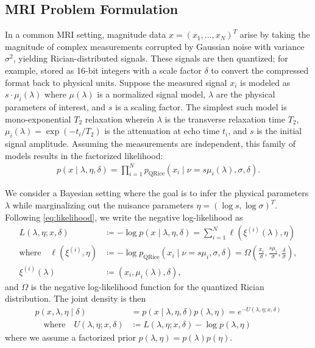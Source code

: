 \documentclass{article}
\begin{document}
\subsection{MRI Problem Formulation}

In a common MRI setting, magnitude data $x = (x_1, \ldots, x_N)^T$ arise by taking the magnitude of complex measurements corrupted by Gaussian noise with variance $\sigma^2$, yielding Rician-distributed signals.
These signals are then quantized;
for example, stored as 16-bit integers with a scale factor $\delta$ to convert the compressed format back to physical units.
Suppose the measured signal $x_i$ is modeled as $s \cdot \mu_i(\lambda)$ where $\mu(\lambda)$ is a normalized signal model, $\lambda$ are the physical parameters of interest, and $s$ is a scaling factor.
The simplest such model is mono-exponential $T_2$ relaxation wherein $\lambda$ is the transverse relaxation time $T_2$, $\mu_i(\lambda) = \exp(-t_i/T_2)$ is the attenuation at echo time $t_i$, and $s$ is the initial signal amplitude.
Assuming the measurements are independent, this family of models results in the factorized likelihood:
%
\begin{align}\label{eq:likelihood}
  p(x \mid \lambda, \eta, \delta) = \prod_{i=1}^N p_{\mathrm{QRice}}(x_i \mid \nu = s \mu_i(\lambda), \sigma, \delta).
\end{align}

We consider a Bayesian setting where the goal is to infer the physical parameters $\lambda$ while marginalizing out the nuisance parameters $\eta = (\log s, \log \sigma)^T$.
Following \cref{eq:likelihood}, we write the negative log-likelihood as
%
\begin{align}\label{eq:negative-log-likelihood}
  L(\lambda, \eta; x, \delta)              & \coloneqq -\log p(x \mid \lambda, \eta, \delta) = \sum_{i=1}^N \ell(\xi^{(i)}(\lambda), \eta)                                                                      \\
  \text{where} \quad \ell(\xi^{(i)}, \eta) & \coloneqq -\log p_{\mathrm{QRice}}(x_i \mid \nu = s \mu_i, \sigma, \delta) = \Omega\left(\frac{x_i}{\sigma}, \frac{s \mu_i}{\sigma}, \frac{\delta}{\sigma}\right), \\
  \xi^{(i)}(\lambda)                       & \coloneqq (x_i, \mu_i(\lambda), \delta),
\end{align}
%
and $\Omega$ is the negative log-likelihood function for the quantized Rician distribution.
The joint density is then
%
\begin{align}
  p(x, \lambda, \eta \mid \delta) & = p(x \mid \lambda, \eta, \delta) p(\lambda, \eta) = e^{-U(\lambda, \eta; x, \delta)} \\
  \quad \text{where} \quad
  U(\lambda, \eta; x, \delta)     & \coloneqq L(\lambda, \eta; x, \delta) - \log p(\lambda, \eta)
\end{align}
%
where we assume a factorized prior $p(\lambda, \eta) = p(\lambda) p(\eta)$.
\end{document}
